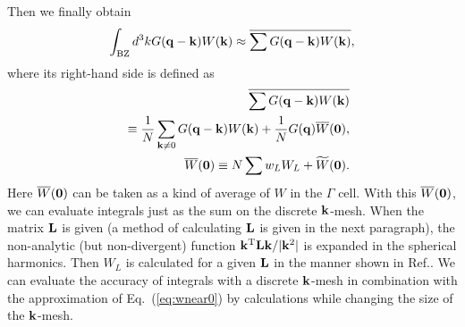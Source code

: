 \documentclass[a4paper,10pt,epsf,fleqn]{article}
\newcommand{\bfzero}{{\bf 0}}
\newcommand{\bfq}{{\bf q}}
\newcommand{\bfk}{{\bf k}}
\newcommand{\req}[1]{\mbox{Eq.~(\ref{#1})}}
\begin{document}
Then we finally obtain
\begin{eqnarray}
\int_{\rm BZ} d^3k G(\bfq-\bfk) W(\bfk) 
\approx \overline{\sum G(\bfq-\bfk) W(\bfk)},\label{eq:bzintbar}
\end{eqnarray}
where its right-hand side is defined as
\begin{eqnarray}
&&\overline{\sum G(\bfq-\bfk) W(\bfk)} \nonumber \\
&&\equiv 
\frac{1}{N} \sum_{\bfk \ne 0} G(\bfq-\bfk) W(\bfk) + \frac{1}{N} G(\bfq)\overline{W}(\bfzero),\\
&&\overline{W}(\bfzero)\equiv N\sum w_L W_L + \widetilde{W}(\bfzero).
\end{eqnarray}
Here $\overline{W}(\bfzero)$ can be taken as a kind of 
average of $W$ in the $\Gamma$ cell.
With this $\overline{W}(\bfzero)$, we can 
evaluate integrals just as the sum on the discrete $\bfk$-mesh.
When the matrix ${\bf L}$ is given 
(a method of calculating ${\bf L}$ is given in the next paragraph),
the non-analytic (but non-divergent) function 
${\bfk^{\rm T}{\bf L}\bfk}/|\bfk^2|$ 
is expanded in the spherical harmonics. Then
$W_L$ is calculated for a given ${\bf L}$ in the manner shown in Ref.\cite{friedrich_efficient_2010}. 
We can evaluate the accuracy of integrals with a discrete $\bfk$-mesh
in combination with the approximation of \req{eq:wnear0} 
by calculations while changing the size of the $\bfk$-mesh.




\end{document}
